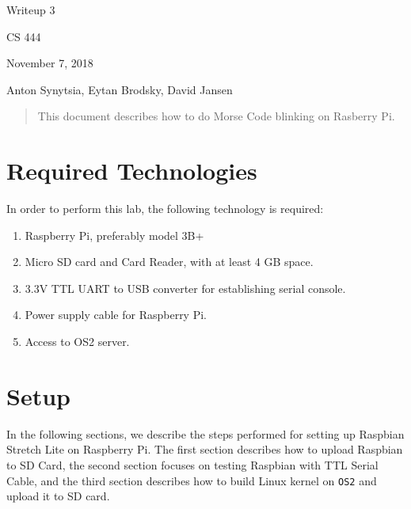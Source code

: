 \documentclass[onecolumn, draftclsnofoot, 10pt, compsoc]{IEEEtran}
\begin{document}
\begin{titlepage}
\begin{singlespace}
\centering
\scshape{
    \huge{Writeup 3}\par
    \vspace{.5in}
    \large{CS 444}\par
    \large{November 7, 2018}\par
    \vspace{.5in}
    \large{Anton Synytsia, Eytan Brodsky, David Jansen}\par
    \vspace{.5in}
    \vfill
}
\begin{abstract}
This document describes how to do Morse Code blinking on Rasberry Pi.
\end{abstract}
\end{singlespace}
\end{titlepage}
\newpage
{}
\tableofcontents
\clearpage

\section{Required Technologies}
In order to perform this lab, the following technology is required:
\begin{enumerate}
\item Raspberry Pi, preferably model 3B+
\item Micro SD card and Card Reader, with at least 4 GB space.
\item 3.3V TTL UART to USB converter for establishing serial console.
\item Power supply cable for Raspberry Pi.
\item Access to OS2 server.
\end{enumerate}


\section{Setup}
In the following sections, we describe the steps performed for setting up Raspbian Stretch Lite on Raspberry Pi. The first section describes how to upload Raspbian to SD Card, the second section focuses on testing Raspbian with TTL Serial Cable, and the third section describes how to build Linux kernel on \texttt{OS2} and upload it to SD card.
\end{document}
